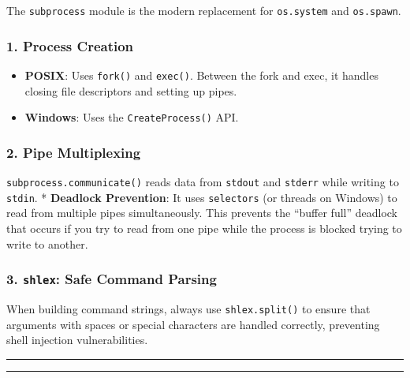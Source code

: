 The \passthrough{\lstinline!subprocess!} module is the modern
replacement for \passthrough{\lstinline!os.system!} and
\passthrough{\lstinline!os.spawn!}.

\hypertarget{process-creation}{%
\subsubsection{1. Process Creation}\label{process-creation}}

\begin{itemize}
\tightlist
\item
  \textbf{POSIX}: Uses \passthrough{\lstinline!fork()!} and
  \passthrough{\lstinline!exec()!}. Between the fork and exec, it
  handles closing file descriptors and setting up pipes.
\item
  \textbf{Windows}: Uses the \passthrough{\lstinline!CreateProcess()!}
  API.
\end{itemize}

\hypertarget{pipe-multiplexing}{%
\subsubsection{2. Pipe Multiplexing}\label{pipe-multiplexing}}

\passthrough{\lstinline!subprocess.communicate()!} reads data from
\passthrough{\lstinline!stdout!} and \passthrough{\lstinline!stderr!}
while writing to \passthrough{\lstinline!stdin!}. * \textbf{Deadlock
Prevention}: It uses \passthrough{\lstinline!selectors!} (or threads on
Windows) to read from multiple pipes simultaneously. This prevents the
``buffer full'' deadlock that occurs if you try to read from one pipe
while the process is blocked trying to write to another.

\hypertarget{shlex-safe-command-parsing}{%
\subsubsection{\texorpdfstring{3. \texttt{shlex}: Safe Command
Parsing}{3. shlex: Safe Command Parsing}}\label{shlex-safe-command-parsing}}

When building command strings, always use
\passthrough{\lstinline!shlex.split()!} to ensure that arguments with
spaces or special characters are handled correctly, preventing shell
injection vulnerabilities.

\begin{center}\rule{0.5\linewidth}{0.5pt}\end{center}

\begin{center}\rule{0.5\linewidth}{0.5pt}\end{center}
